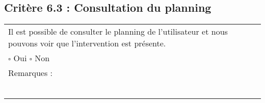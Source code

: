   	\subsection*{Critère 6.3 : Consultation du planning}
  		\begin{center}
    	 		\begin{tabular}[h]{|p{}|}
			\hline
				Il est possible de consulter le planning de l'utilisateur et nous pouvons voir que l'intervention est présente. \\
				
				$\square$ Oui  \hfill \hfill $\square$ Non \\\hline Remarques : \\ ~\\
			 \\\hline
     		\end{tabular}
  		\end{center}	